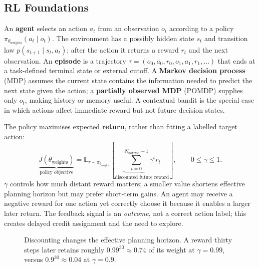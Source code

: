 \subsection{RL Foundations}\label{sec:rl-foundations}
An \textbf{agent} selects an action $a_t$ from an observation $o_t$ according to a policy $\pi_{\theta_{\mathrm{weights}}}(a_t\mid o_t)$.
The environment has a possibly hidden state $s_t$ and transition law $p(s_{t+1}\mid s_t,a_t)$; after the action it returns a reward $r_t$ and the next observation.
An \textbf{episode} is a trajectory $\tau=(o_0,a_0,r_0,o_1,a_1,r_1,\ldots)$ that ends at a task-defined terminal state or external cutoff.
A \textbf{Markov decision process} (MDP) assumes the current state contains the information needed to predict the next state given the action; a \textbf{partially observed MDP} (POMDP) supplies only $o_t$, making history or memory useful.
A contextual bandit is the special case in which actions affect immediate reward but not future decision states.

The policy maximises expected \textbf{return}, rather than fitting a labelled target action:
\[
\underbrace{J(\theta_{\mathrm{weights}})}_{\text{policy objective}}
=\mathbb E_{\tau\sim\pi_{\theta_{\mathrm{weights}}}}
\!\left[\underbrace{\sum_{t=0}^{N_{\mathrm{horizon}}-1}\gamma^t r_t}_{\text{discounted future reward}}\right],\qquad 0\leq\gamma\leq1.
\]
$\gamma$ controls how much distant reward matters; a smaller value shortens effective planning horizon but may prefer short-term gains.
An agent may receive a negative reward for one action yet correctly choose it because it enables a larger later return.
The feedback signal is an \emph{outcome}, not a correct action label; this creates delayed credit assignment and the need to explore.

\begin{figure}[!htbp]\centering
{}
\caption{Discounting changes the effective planning horizon. A reward thirty steps later retains roughly $0.99^{30}\approx0.74$ of its weight at $\gamma=0.99$, versus $0.9^{30}\approx0.04$ at $\gamma=0.9$.}
\label{fig:rl-discount}
\end{figure}

